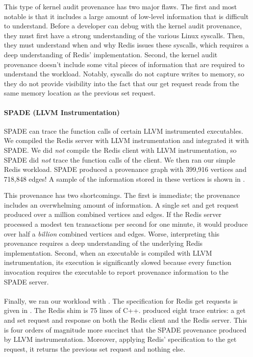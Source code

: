 This type of kernel audit provenance has two major flaws. The first and most
notable is that it includes a large amount of low-level information that is
difficult to understand. Before a developer can debug with the kernel audit
provenance, they must first have a strong understanding of the various Linux
syscalls. Then, they must understand when and why Redis issues these syscalls,
which requires a deep understanding of Redis' implementation. Second, the
kernel audit provenance doesn't include some vital pieces of information that
are required to understand the workload. Notably, syscalls do not capture
writes to memory, so they do not provide visibility into the fact that our get
request reads from the same memory location as the previous set request.

\paragraph{SPADE (LLVM Instrumentation)}
SPADE can trace the function calls of certain LLVM instrumented executables. We
compiled the Redis server with LLVM instrumentation and integrated it with
SPADE. We did \emph{not} compile the Redis client with LLVM instrumentation, so
SPADE did \emph{not} trace the function calls of the client. We then ran our
simple Redis workload. SPADE produced a provenance graph with 399,916 vertices
and 718,848 edges! A sample of the information stored in these vertices is
shown in .

This provenance has two shortcomings. The first is immediate; the provenance
includes an overwhelming amount of information. A single set and get request
produced over a million combined vertices and edges. If the Redis server
processed a modest ten transactions per second for one minute, it would produce
over half a \emph{billion} combined vertices and edges. Worse, interpreting
this provenance requires a deep understanding of the underlying Redis
implementation. Second, when an executable is compiled with LLVM
instrumentation, its execution is significantly slowed because every function
invocation requires the executable to report provenance information to the
SPADE server.

\paragraph{\fluent{}}
Finally, we ran our workload with \fluent{}. The \fluent{} \watprovenance{}
specification for Redis get requests is given in
. The Redis shim is 75 lines of C++.  \fluent{}
produced eight trace entries: a get and set request and response on both the
Redis client and the Redis server. This is four orders of magnitude more
succinct that the SPADE provenance produced by LLVM instrumentation. Moreover,
applying Redis' \watprovenance{} specification to the get request, it returns
the previous set request and nothing else.
%

